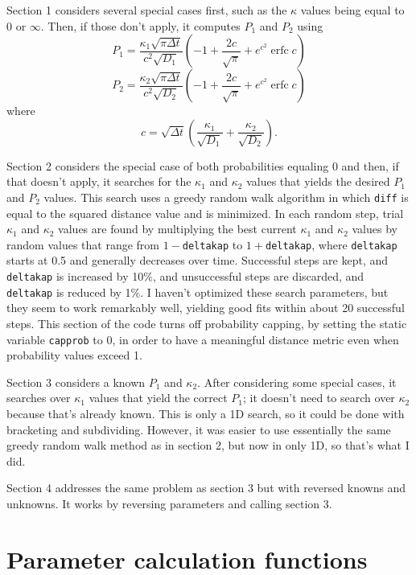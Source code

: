 \documentclass[11pt]{article}
\newcommand {\ttt} {\texttt}
\DeclareMathOperator{\erfc}{erfc}
\begin{document}
\begin{description}
Section 1 considers several special cases first, such as the $\kappa$ values being equal to 0 or $\infty$. Then, if those don't apply, it computes $P_1$ and $P_2$ using
$$P_1 = \frac{\kappa_1 \sqrt{\pi \Delta t}}{c^{2} \sqrt{D_1}} \left( -1 + \frac{2c}{\sqrt{\pi}} + e^{c^2} \erfc c \right)$$
$$P_2 = \frac{\kappa_2 \sqrt{\pi \Delta t}}{c^{2} \sqrt{D_2}} \left( -1 + \frac{2c}{\sqrt{\pi}} + e^{c^2} \erfc c \right)$$
where
$$c=\sqrt{\Delta t} \left( \frac{\kappa_1}{\sqrt{D_1}}+\frac{\kappa_2}{\sqrt{ D_2}} \right).$$

Section 2 considers the special case of both probabilities equaling 0 and then, if that doesn't apply, it searches for the $\kappa_1$ and $\kappa_2$ values that yields the desired $P_1$ and $P_2$ values. This search uses a greedy random walk algorithm in which \ttt{diff} is equal to the squared distance value and is minimized. In each random step, trial $\kappa_1$ and $\kappa_2$ values are found by multiplying the best current $\kappa_1$ and $\kappa_2$ values by random values that range from $1-$\ttt{deltakap} to $1+$\ttt{deltakap}, where \ttt{deltakap} starts at 0.5 and generally decreases over time. Successful steps are kept, and \ttt{deltakap} is increased by 10\%, and unsuccessful steps are discarded, and \ttt{deltakap} is reduced by 1\%. I haven't optimized these search parameters, but they seem to work remarkably well, yielding good fits within about 20 successful steps. This section of the code turns off probability capping, by setting the static variable \ttt{capprob} to 0, in order to have a meaningful distance metric even when probability values exceed 1.

Section 3 considers a known $P_1$ and $\kappa_2$. After considering some special cases, it searches over $\kappa_1$ values that yield the correct $P_1$; it doesn't need to search over $\kappa_2$ because that's already known. This is only a 1D search, so it could be done with bracketing and subdividing. However, it was easier to use essentially the same greedy random walk method as in section 2, but now in only 1D, so that's what I did.

Section 4 addresses the same problem as section 3 but with reversed knowns and unknowns. It works by reversing parameters and calling section 3.

\end{description}

\section{Parameter calculation functions}
\end{document}
